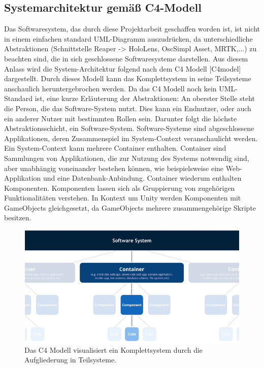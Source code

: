 \documentclass[11pt, titlepage, fleqn]{report}
\begin{document}
            \subsection{Systemarchitektur gemäß C4-Modell}
            \label{sec:3.3.1}
                Das Softwaresystem, das durch diese Projektarbeit geschaffen worden ist, ist nicht in einem einfachen standard 
                UML-Diagramm auszudrücken, da unterschiedliche Abstraktionen (Schnittstelle Reaper -> HoloLens, OscSimpl Asset, MRTK,...) 
                zu beachten sind, die in sich geschlossene Softwaresysteme darstellen. Aus diesem Anlass wird die System-Architektur 
                folgend nach dem C4 Modell [C4model] dargestellt. Durch dieses Modell kann das Komplettsystem in seine Teilsysteme 
                anschaulich heruntergebrochen werden. 
                Da das C4 Modell noch kein UML-Standard ist, eine kurze Erläuterung der Abstraktionen: 
                An oberster Stelle steht die Person, die das Software-System nutzt. Dies kann ein Endnutzer, oder auch ein anderer Nutzer 
                mit bestimmten Rollen sein.
                Darunter folgt die höchste Abstraktionsschicht, ein Software-System. Software-Systeme sind abgeschlossene Applikationen, 
                deren Zusammenspiel im System-Context veranschaulicht werden.
                Ein System-Context kann mehrere Container enthalten. Container sind Sammlungen von Applikationen, die zur Nutzung des 
                Systems notwendig sind, aber unabhängig voneinander bestehen können, wie beispielsweise eine Web-Applikation und eine 
                Datenbank-Anbindung.
                Container wiederum enthalten Komponenten. Komponenten lassen sich als Gruppierung von zugehörigen Funktionalitäten 
                verstehen. In Kontext um Unity werden Komponenten mit GameObjects gleichgesetzt, da GameObjects mehrere zusammengehörige 
                Skripte besitzen.
                \begin{figure}[htbp]
                    \centering
                    \includegraphics[width=14cm]{./img/c4Model.png}
                    \caption{Das C4 Modell visualisiert ein Komplettsystem durch die Aufgliederung in Teilsysteme.\label{fig:C4}}
                \end{figure}
\end{document}
